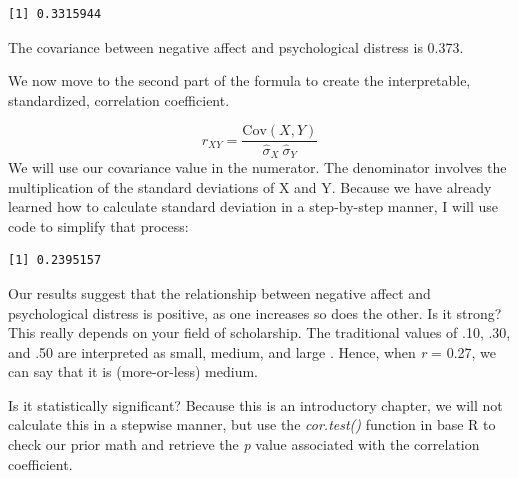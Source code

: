 \documentclass[
  11pt,
]{book}
\newenvironment{Shaded}{\begin{snugshade}}{\end{snugshade}}
\newcommand{\FunctionTok}[1]{\textcolor[rgb]{0.27,0.27,0.27}{\textbf{#1}}}
\newcommand{\NormalTok}[1]{#1}
\newcommand{\SpecialCharTok}[1]{\textcolor[rgb]{0.43,0.43,0.43}{\textbf{#1}}}
\begin{document}
\begin{verbatim}
[1] 0.3315944
\end{verbatim}

The covariance between negative affect and psychological distress is 0.373.

We now move to the second part of the formula to create the interpretable, standardized, correlation coefficient.

\[
r_{XY}  = \frac{\mbox{Cov}(X,Y)}{ \hat{\sigma}_X \ \hat{\sigma}_Y}
\] We will use our covariance value in the numerator. The denominator involves the multiplication of the standard deviations of X and Y. Because we have already learned how to calculate standard deviation in a step-by-step manner, I will use code to simplify that process:

\begin{Shaded}
\end{Shaded}

\begin{verbatim}
[1] 0.2395157
\end{verbatim}

Our results suggest that the relationship between negative affect and psychological distress is positive, as one increases so does the other. Is it strong? This really depends on your field of scholarship. The traditional values of .10, .30, and .50 are interpreted as small, medium, and large \citep{cohen_applied_2003}. Hence, when \emph{r} = 0.27, we can say that it is (more-or-less) medium.

Is it statistically significant? Because this is an introductory chapter, we will not calculate this in a stepwise manner, but use the \emph{cor.test()} function in base R to check our prior math and retrieve the \emph{p} value associated with the correlation coefficient.

\begin{Shaded}
\end{Shaded}
\end{document}
